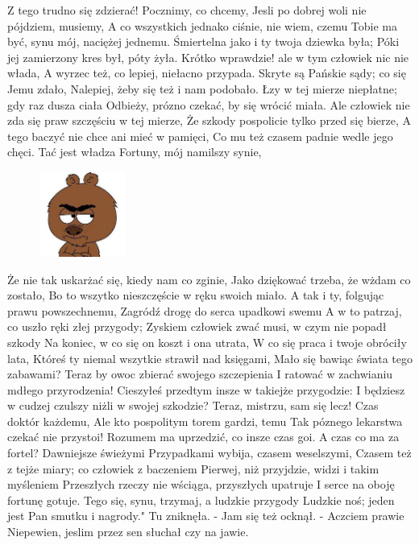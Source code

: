 \documentclass{article}
\begin{document}
Z tego trudno się zdzierać! Pocznimy, co chcemy,
Jesli po dobrej woli nie pójdziem, musiemy,
A co wszystkich jednako ciśnie, nie wiem, czemu
Tobie ma być, synu mój, naciężej jednemu.
Śmiertelna jako i ty twoja dziewka była;
Póki jej zamierzony kres był, póty żyła.
Krótko wprawdzie! ale w tym człowiek nic nie włada,
A wyrzec też, co lepiej, niełacno przypada.
Skryte są Pańskie sądy; co się Jemu zdało,
Nalepiej, żeby się też i nam podobało.
Łzy w tej mierze niepłatne; gdy raz dusza ciała
Odbieży, prózno czekać, by się wrócić miała.
Ale człowiek nie zda się praw szczęściu w tej mierze,
Że szkody pospolicie tylko przed się bierze,
A tego baczyć nie chce ani mieć w pamięci,
Co mu też czasem padnie wedle jego chęci.
Tać jest władza Fortuny, mój namilszy synie, \label{o1}
\begin{figure}
    \centering
    \includegraphics[width=0.25\textwidth]{malloy.jpg}
\end{figure}
Że nie tak uskarżać się, kiedy nam co zginie,
Jako dziękować trzeba, że wżdam co zostało,
Bo to wszytko nieszczęście w ręku swoich miało.
A tak i ty, folgując prawu powszechnemu,
Zagródź drogę do serca upadkowi swemu
A w to patrzaj, co uszło ręki złej przygody;
Zyskiem człowiek zwać musi, w czym nie popadł szkody
Na koniec, w co się on koszt i ona utrata,
W co się praca i twoje obróciły lata,
Któreś ty niemal wszytkie strawił nad księgami,
Mało się bawiąc świata tego zabawami?
Teraz by owoc zbierać swojego szczepienia
I ratować w zachwianiu mdłego przyrodzenia!
Cieszyłeś przedtym insze w takiejże przygodzie:
I będziesz w cudzej czulszy niżli w swojej szkodzie?
Teraz, mistrzu, sam się lecz! Czas doktór każdemu,
Ale kto pospolitym torem gardzi, temu
Tak póznego lekarstwa czekać nie przystoi!
Rozumem ma uprzedzić, co insze czas goi.
A czas co ma za fortel? Dawniejsze świeżymi
Przypadkami wybija, czasem weselszymi,
Czasem też z tejże miary; co człowiek z baczeniem
Pierwej, niż przyjdzie, widzi i takim myśleniem
Przeszłych rzeczy nie wściąga, przyszłych upatruje
I serce na oboję fortunę gotuje.
Tego się, synu, trzymaj, a ludzkie przygody
Ludzkie noś; jeden jest Pan smutku i nagrody."
Tu zniknęła. - Jam się też ocknął. - Aczciem prawie
Niepewien, jeslim przez sen słuchał czy na jawie.
\end{document}
